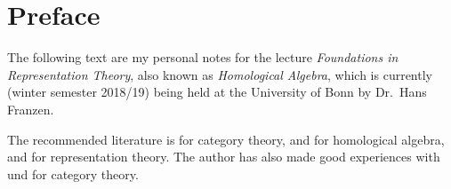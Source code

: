 \chapter{Preface}

The following text are my personal notes for the lecture \emph{Foundations in Representation Theory}, also known as \emph{Homological Algebra}, which is currently (winter semester 2018/19) being held at the University of Bonn by Dr.\ Hans Franzen.

The recommended literature is \cite{Working} for category theory, \cite[Chapter~1]{SheavesManifolds} and \cite{Weibel} for homological algebra, and \cite{Elements} for representation theory.
The author has also made good experiences with \cite{BasicCategory} und \cite{Brandenburg} for category theory.
